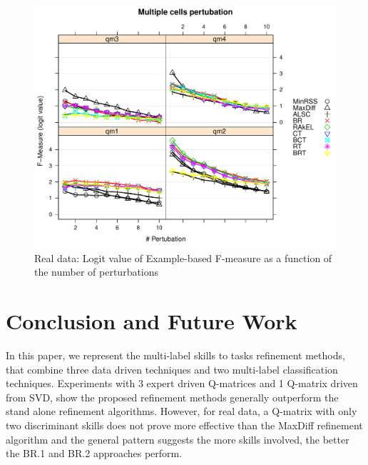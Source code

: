 \documentclass[runningheads,a4paper]{llncs}
\begin{document}
\begin{figure}
  \centering
    \includegraphics[width=100 mm ,scale=0.25]{graph/FM.pdf}
    \caption{Real data: Logit value of Example-based F-measure as a function of the number of perturbations}\label{fig:FMforReal}
\end{figure}






\section{Conclusion and Future Work}\label{sec:conclusion--future}
In this paper, we represent the multi-label skills to tasks refinement methods, that combine three data driven techniques and two multi-label classification techniques. Experiments with 3 expert driven Q-matrices and 1 Q-matrix driven from SVD, show the proposed refinement methods generally outperform the stand alone refinement algorithms. However, for real data, a Q-matrix with only two discriminant skills does not prove more effective than the MaxDiff refinement algorithm and the general pattern suggests the more skills involved, the better the BR.1 and BR.2 approaches perform.
\end{document}
